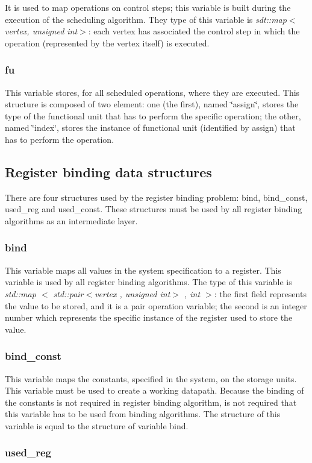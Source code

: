 It is used to map operations on control steps; this variable is built during the execution of the scheduling algorithm. They type of this variable is {\itshape sdt\+::map$<$vertex, unsigned int$>$}\+: each vertex has associated the control step in which the operation (represented by the vertex itself) is executed. \hypertarget{src_HLS_page_fu}{}\subsubsection{fu}\label{src_HLS_page_fu}
This variable stores, for all scheduled operations, where they are executed. This structure is composed of two element\+: one (the first), named \char`\"{}assign\char`\"{}, stores the type of the functional unit that has to perform the specific operation; the other, named \char`\"{}index\char`\"{}, stores the instance of functional unit (identified by assign) that has to perform the operation. \hypertarget{src_HLS_page_src_HLS_data_structure_binding}{}\subsection{Register binding data structures}\label{src_HLS_page_src_HLS_data_structure_binding}
There are four structures used by the register binding problem\+: bind, bind\+\_\+const, used\+\_\+reg and used\+\_\+const. These structures must be used by all register binding algorithms as an intermediate layer. \hypertarget{src_HLS_page_bind}{}\subsubsection{bind}\label{src_HLS_page_bind}
This variable maps all values in the system specification to a register. This variable is used by all register binding algorithms. The type of this variable is {\itshape std\+::map $<$ std\+::pair$<$vertex , unsigned int$>$ , int $>$}\+: the first field represents the value to be stored, and it is a pair operation variable; the second is an integer number which represents the specific instance of the register used to store the value. \hypertarget{src_HLS_page_bind_const}{}\subsubsection{bind\+\_\+const}\label{src_HLS_page_bind_const}
This variable maps the constants, specified in the system, on the storage units. This variable must be used to create a working datapath. Because the binding of the constants is not required in register binding algorithm, is not required that this variable has to be used from binding algorithms. The structure of this variable is equal to the structure of variable bind. \hypertarget{src_HLS_page_used_reg}{}\subsubsection{used\+\_\+reg}\label{src_HLS_page_used_reg}
